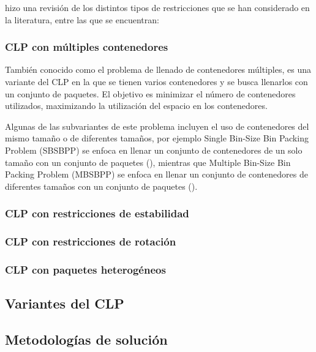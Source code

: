 \textcite{Bortfeldt20131} hizo una revisión de los distintos tipos de restricciones que se han considerado en la literatura, entre las que se encuentran:

\subsubsection{CLP con múltiples contenedores}

También conocido como el problema de llenado de contenedores múltiples, es una variante del CLP en la que se tienen varios contenedores y se busca llenarlos con un conjunto de paquetes. El objetivo es minimizar el número de contenedores utilizados, maximizando la utilización del espacio en los contenedores.

Algunas de las subvariantes de este problema incluyen el uso de contenedores del mismo tamaño o de diferentes tamaños, por ejemplo Single Bin-Size Bin Packing Problem (SBSBPP) se enfoca en llenar un conjunto de contenedores de un solo tamaño con un conjunto de paquetes (\textcite{ren2011priority}), mientras que Multiple Bin-Size Bin Packing Problem (MBSBPP) se enfoca en llenar un conjunto de contenedores de diferentes tamaños con un conjunto de paquetes (\textcite{zhao2016comparative}).

\subsubsection{CLP con restricciones de estabilidad}

\subsubsection{CLP con restricciones de rotación}

\subsubsection{CLP con paquetes heterogéneos}


\subsection{Variantes del CLP}

\subsection{Metodologías de solución}

